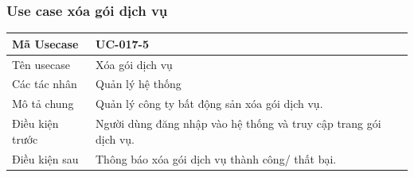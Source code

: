 \documentclass[12pt,a4paper]{article}
\begin{document}
    \subsubsection*{Use case xóa gói dịch vụ }
    \begin{table}[H]
        \centering
        \begin{tabular}{|p{3.5cm}|p{11.5cm}|c|}
            \hline
            Mã Usecase      & UC-017-5                                                         \\
            \hline
            Tên usecase     & Xóa gói dịch vụ                                                  \\
            \hline
            Các tác nhân    & Quản lý hệ thống                                                 \\
            \hline
            Mô tả chung     & Quản lý công ty bất động sản xóa gói dịch vụ.                    \\
            \hline

            Điều kiện trước & Người dùng đăng nhập vào hệ thống và truy cập trang gói dịch vụ. \\
            \hline

            Điều kiện sau   & Thông báo xóa gói dịch vụ thành công/ thất bại.                  \\
            \hline


\end{tabular}
\end{table}
\end{document}
